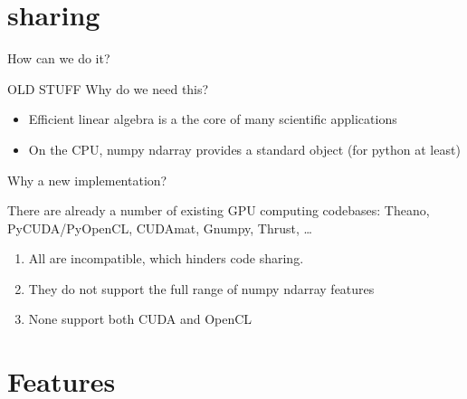 \documentclass[utf8x,xcolor=pdftex,dvipsnames,table]{beamer}
\begin{document}
\section{sharing}
\begin{frame}{How can we do it?}


\end{frame}

\begin{frame}{OLD STUFF Why do we need this?}
\begin{itemize}
\item Efficient linear algebra is a the core of many scientific applications
\item On the CPU, numpy ndarray provides a standard object (for python at least)
\end{itemize}
\end{frame}

\begin{frame}{Why a new implementation?}
\begin{block}{There are already a number of existing GPU computing codebases:}
Theano, PyCUDA/PyOpenCL, CUDAmat, Gnumpy, Thrust, \ldots
\end {block}
\begin{enumerate}
\item<2-> All are incompatible, which hinders code sharing.
\item<3-> They do not support the full range of numpy ndarray features
\item<4-> None support both CUDA and OpenCL
\end{enumerate}
\end{frame}

\section{Features}
\end{document}
